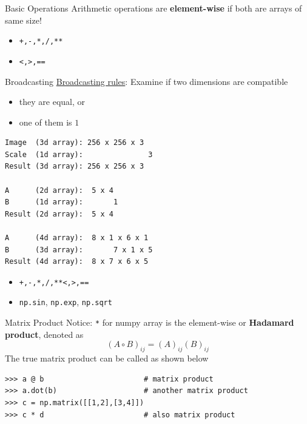 \documentclass{../TexTemplate/myslide}
\begin{document}
\begin{frame}[fragile]{Basic Operations}
Arithmetic operations are \textbf{element-wise} if both are arrays of same size!
\begin{itemize}
	\item \verb'+,-,*,/,**'
	\item \verb'<,>,=='
\end{itemize}
\end{frame}

\begin{frame}[fragile]{Broadcasting}
\href{https://docs.scipy.org/doc/numpy/user/basics.broadcasting.html}{Broadcasting rules}: Examine if two dimensions are compatible
\begin{itemize}
	\item they are equal, or
	\item one of them is $1$
\end{itemize}
\begin{lstlisting}
Image  (3d array): 256 x 256 x 3
Scale  (1d array):               3
Result (3d array): 256 x 256 x 3

A      (2d array):  5 x 4
B      (1d array):       1
Result (2d array):  5 x 4

A      (4d array):  8 x 1 x 6 x 1
B      (3d array):       7 x 1 x 5
Result (4d array):  8 x 7 x 6 x 5
\end{lstlisting}
\begin{itemize}
	\item \verb'+,-,*,/,**'\qquad \verb'<,>,=='
	\item \verb'np.sin', \verb'np.exp', \verb'np.sqrt'
\end{itemize}
\end{frame}

\begin{frame}[fragile]{Matrix Product}
Notice: \verb'*' for numpy array is the element-wise or \textbf{Hadamard product}, denoted as
\[(A\circ B)_{ij}=(A)_{ij}(B)_{ij}\]
The true matrix product can be called as shown below
\begin{lstlisting}
>>> a @ b                       # matrix product
>>> a.dot(b)                    # another matrix product
>>> c = np.matrix([[1,2],[3,4]])
>>> c * d                       # also matrix product
\end{lstlisting}
\end{frame}
\end{document}

